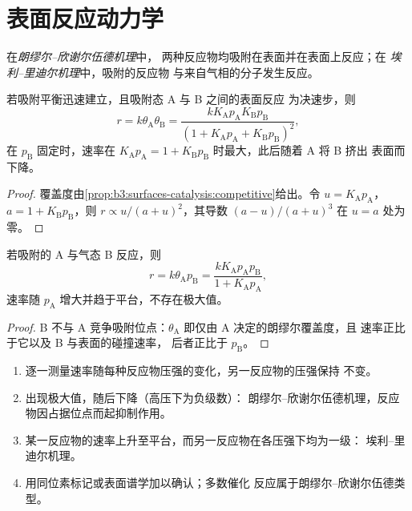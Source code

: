 \section{表面反应动力学}

\begin{definition}\label{def:b3:surfaces-catalysis:mechanisms}
在\emph{朗缪尔–欣谢尔伍德机理}中，
两种反应物均吸附在表面并在表面上反应；在
\emph{埃利–里迪尔机理}中，吸附的反应物
与来自气相的分子发生反应。
\end{definition}

\begin{proposition}\label{prop:b3:surfaces-catalysis:lh-rate}
若吸附平衡迅速建立，且吸附态 A 与 B 之间的表面反应
为决速步，则
\[
  r = k\theta_{\mathrm A}\theta_{\mathrm B} = \frac{kK_{\mathrm A}p_{\mathrm A}K_{\mathrm B}p_{\mathrm B}}{(1 + K_{\mathrm A}p_{\mathrm A} + K_{\mathrm B}p_{\mathrm B})^2},
\]
在 $p_{\mathrm B}$ 固定时，速率在 $K_{\mathrm A}p_{\mathrm A} = 1 + K_{\mathrm B}p_{\mathrm B}$ 时最大，此后随着 A 将 B 挤出
表面而下降。
\end{proposition}

\begin{proof}
覆盖度由\cref{prop:b3:surfaces-catalysis:competitive}给出。令 $u =
K_{\mathrm A}p_{\mathrm A}$，$a = 1 + K_{\mathrm B}p_{\mathrm B}$，则 $r \propto u/(a + u)^2$，其导数 $(a - u)/(a + u)^3$ 在
$u = a$ 处为零。
\end{proof}

\begin{proposition}[埃利–里迪尔速率]\label{prop:b3:surfaces-catalysis:er-rate}
若吸附的 A 与气态 B 反应，则
\[
  r = k\theta_{\mathrm A}p_{\mathrm B} = \frac{kK_{\mathrm A}p_{\mathrm A}p_{\mathrm B}}{1 + K_{\mathrm A}p_{\mathrm A}},
\]
速率随 $p_{\mathrm A}$ 增大并趋于平台，不存在极大值。
\end{proposition}

\begin{proof}
B 不与 A 竞争吸附位点：$\theta_{\mathrm A}$ 即仅由 A 决定的朗缪尔覆盖度，且
速率正比于它以及 B 与表面的碰撞速率，
后者正比于 $p_{\mathrm B}$。
\end{proof}

\begin{method}[由压强依赖关系判断为 LH 还是 ER]\label{met:b3:surfaces-catalysis:mechanism-from-rate}
\begin{enumerate}
  \item 逐一测量速率随每种反应物压强的变化，另一反应物的压强保持
        不变。
  \item 出现极大值，随后下降（高压下为负级数）：
        朗缪尔–欣谢尔伍德机理，反应物因占据位点而起抑制作用。
  \item 某一反应物的速率上升至平台，而另一反应物在各压强下均为一级：
        埃利–里迪尔机理。
  \item 用同位素标记或表面谱学加以确认；多数催化
        反应属于朗缪尔–欣谢尔伍德类型。
\end{enumerate}
\end{method}

